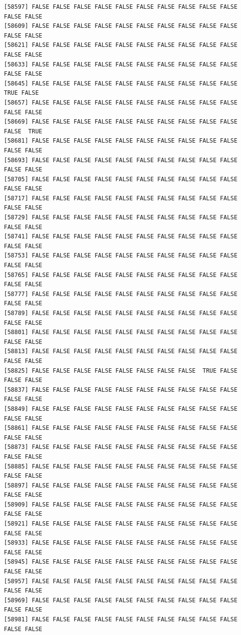 \documentclass[
  a4paper,
  DIV=11,
  numbers=noendperiod]{scrartcl}
\begin{document}
\begin{verbatim}
[58597] FALSE FALSE FALSE FALSE FALSE FALSE FALSE FALSE FALSE FALSE FALSE FALSE
[58609] FALSE FALSE FALSE FALSE FALSE FALSE FALSE FALSE FALSE FALSE FALSE FALSE
[58621] FALSE FALSE FALSE FALSE FALSE FALSE FALSE FALSE FALSE FALSE FALSE FALSE
[58633] FALSE FALSE FALSE FALSE FALSE FALSE FALSE FALSE FALSE FALSE FALSE FALSE
[58645] FALSE FALSE FALSE FALSE FALSE FALSE FALSE FALSE FALSE FALSE  TRUE FALSE
[58657] FALSE FALSE FALSE FALSE FALSE FALSE FALSE FALSE FALSE FALSE FALSE FALSE
[58669] FALSE FALSE FALSE FALSE FALSE FALSE FALSE FALSE FALSE FALSE FALSE  TRUE
[58681] FALSE FALSE FALSE FALSE FALSE FALSE FALSE FALSE FALSE FALSE FALSE FALSE
[58693] FALSE FALSE FALSE FALSE FALSE FALSE FALSE FALSE FALSE FALSE FALSE FALSE
[58705] FALSE FALSE FALSE FALSE FALSE FALSE FALSE FALSE FALSE FALSE FALSE FALSE
[58717] FALSE FALSE FALSE FALSE FALSE FALSE FALSE FALSE FALSE FALSE FALSE FALSE
[58729] FALSE FALSE FALSE FALSE FALSE FALSE FALSE FALSE FALSE FALSE FALSE FALSE
[58741] FALSE FALSE FALSE FALSE FALSE FALSE FALSE FALSE FALSE FALSE FALSE FALSE
[58753] FALSE FALSE FALSE FALSE FALSE FALSE FALSE FALSE FALSE FALSE FALSE FALSE
[58765] FALSE FALSE FALSE FALSE FALSE FALSE FALSE FALSE FALSE FALSE FALSE FALSE
[58777] FALSE FALSE FALSE FALSE FALSE FALSE FALSE FALSE FALSE FALSE FALSE FALSE
[58789] FALSE FALSE FALSE FALSE FALSE FALSE FALSE FALSE FALSE FALSE FALSE FALSE
[58801] FALSE FALSE FALSE FALSE FALSE FALSE FALSE FALSE FALSE FALSE FALSE FALSE
[58813] FALSE FALSE FALSE FALSE FALSE FALSE FALSE FALSE FALSE FALSE FALSE FALSE
[58825] FALSE FALSE FALSE FALSE FALSE FALSE FALSE FALSE  TRUE FALSE FALSE FALSE
[58837] FALSE FALSE FALSE FALSE FALSE FALSE FALSE FALSE FALSE FALSE FALSE FALSE
[58849] FALSE FALSE FALSE FALSE FALSE FALSE FALSE FALSE FALSE FALSE FALSE FALSE
[58861] FALSE FALSE FALSE FALSE FALSE FALSE FALSE FALSE FALSE FALSE FALSE FALSE
[58873] FALSE FALSE FALSE FALSE FALSE FALSE FALSE FALSE FALSE FALSE FALSE FALSE
[58885] FALSE FALSE FALSE FALSE FALSE FALSE FALSE FALSE FALSE FALSE FALSE FALSE
[58897] FALSE FALSE FALSE FALSE FALSE FALSE FALSE FALSE FALSE FALSE FALSE FALSE
[58909] FALSE FALSE FALSE FALSE FALSE FALSE FALSE FALSE FALSE FALSE FALSE FALSE
[58921] FALSE FALSE FALSE FALSE FALSE FALSE FALSE FALSE FALSE FALSE FALSE FALSE
[58933] FALSE FALSE FALSE FALSE FALSE FALSE FALSE FALSE FALSE FALSE FALSE FALSE
[58945] FALSE FALSE FALSE FALSE FALSE FALSE FALSE FALSE FALSE FALSE FALSE FALSE
[58957] FALSE FALSE FALSE FALSE FALSE FALSE FALSE FALSE FALSE FALSE FALSE FALSE
[58969] FALSE FALSE FALSE FALSE FALSE FALSE FALSE FALSE FALSE FALSE FALSE FALSE
[58981] FALSE FALSE FALSE FALSE FALSE FALSE FALSE FALSE FALSE FALSE FALSE FALSE

\end{verbatim}
\end{document}
